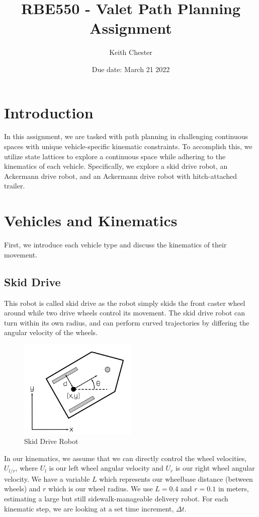 \documentclass{article}
\title{RBE550 - Valet Path Planning Assignment}
\author{Keith Chester}
\date{Due date: March 21 2022}
\begin{document}
\maketitle

\section*{Introduction}
In this assignment, we are tasked with path planning in challenging continuous spaces with unique vehicle-specific kinematic constraints. To accomplish this, we utilize state lattices to explore a continuous space while adhering to the kinematics of each vehicle. Specifically, we explore a skid drive robot, an Ackermann drive robot, and an Ackermann drive robot with hitch-attached trailer.

\section*{Vehicles and Kinematics}

First, we introduce each vehicle type and discuss the kinematics of their movement.

\subsection*{Skid Drive}
This robot is called skid drive as the robot simply skids the front caster wheel around while two drive wheels control its movement. The skid drive robot can turn within its own radius, and can perform curved trajectories by differing the angular velocity of the wheels.

\begin{figure}[H]
    \centering
    \includegraphics[width = 0.5\textwidth]{imgs/skid.png}
    \caption{Skid Drive Robot}
    \label{fig:skid-drive}
\end{figure}

In our kinematics, we assume that we can directly control the wheel velocities, $U_{l/r}$, where $U_l$ is our left wheel angular velocity and $U_r$ is our right wheel angular velocity. We have a variable $L$ which represents our wheelbase distance (between wheels) and $r$ which is our wheel radius. We use $L=0.4$ and $r=0.1$ in meters, estimating a large but still sidewalk-manageable delivery robot. For each kinematic step, we are looking at a set time increment, $\Delta t$.
\end{document}
